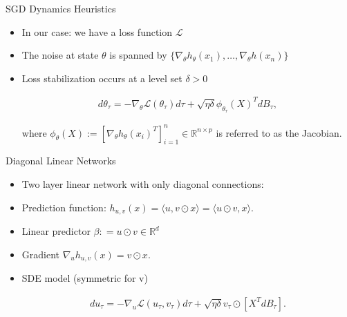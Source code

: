 \documentclass[fleqn]{beamer}
\begin{document}
    \begin{frame}{SGD Dynamics Heuristics}
        \begin{itemize}[<+->]
            \item In our case: we have a loss function $\mathcal{L}$
            \item The noise at state $\theta$ is spanned by
                $\{\nabla_\theta h_\theta(x_1), \ldots, \nabla_\theta
                h(x_n)\} $
            \item Loss stabilization occurs at a level set $\delta > 0$
            \begin{center}
            \begin{minipage}{0.5\textwidth}
                \begin{align*}
                    d\theta_\tau = -\nabla_\theta \mathcal{L}(\theta_\tau)d\tau
                    + \sqrt{\eta\delta}
                    \phi_{\theta_\tau}\left(X\right)^{T}dB_\tau,
                \end{align*}
            \end{minipage}
            \end{center}
            \vspace{0.5cm}
            where $\phi_\theta(X) := [\nabla_\theta
            h_\theta(x_i)^{T}]_{i=1}^{n} \in \mathbb{R}^{n\times p}$ is
            referred to as the Jacobian.
        \end{itemize}
    \end{frame}

    \begin{frame}{Diagonal Linear Networks}
        \begin{itemize}[<+->]
            \item Two layer linear network with only diagonal connections:
            \item Prediction function:
                $h_{u, v}(x) = \langle u, v\odot x\rangle =  \langle u \odot
                v, x\rangle$.
            \item Linear predictor $\beta: = u \odot v \in \mathbb{R}^{d}$
            \item Gradient $\nabla_u h_{u, v}(x) = v \odot x$.
            \item SDE model (symmetric for v)
            \begin{center}
            \begin{minipage}{0.5\textwidth}
                \begin{align*}
                    du_\tau = -\nabla_u \mathcal{L}(u_\tau, v_\tau) d\tau
                    +\sqrt{\eta \delta} v_\tau \odot [X^{T}dB_\tau].
                \end{align*}
            \end{minipage}
            \end{center}

        \end{itemize}
    \end{frame}
\end{document}
